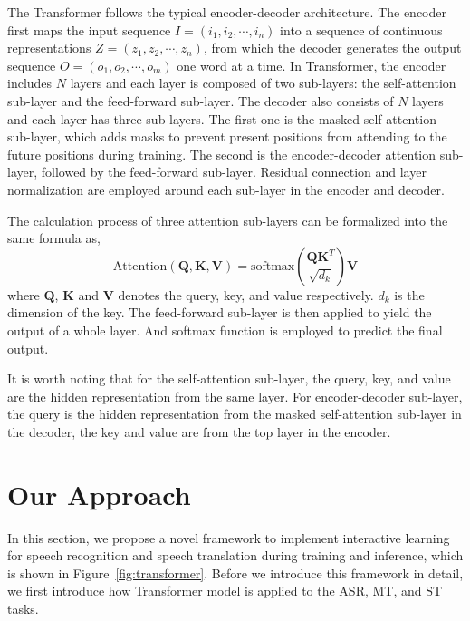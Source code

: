\documentclass[letterpaper]{article} %
\begin{document}
The Transformer follows the typical encoder-decoder architecture. The encoder first maps the input sequence $\mathbf{\mathit{I}}=(i_1,i_2,\cdots,i_n)$ into a sequence of continuous representations $\mathbf{\mathit{Z}}=(z_1,z_2,\cdots,z_n)$, from which  the decoder generates the output sequence $\mathbf{\mathit{O}}=(o_1,o_2,\cdots,o_m)$ one word at a time. In Transformer, the encoder includes $N$ layers and each layer is composed of two sub-layers: the self-attention sub-layer and the feed-forward sub-layer.
The decoder also consists of $N$ layers and each layer has three sub-layers. The first one is the masked self-attention sub-layer, which adds masks to prevent present positions from attending to the future positions during training. The second is the encoder-decoder attention sub-layer, followed by the feed-forward sub-layer. Residual connection and layer normalization are employed around each sub-layer in the encoder and decoder.

The calculation process of three attention sub-layers can be formalized into the same formula as,
\begin{equation}
\mathrm{Attention(\mathbf{Q},\mathbf{K},\mathbf{V})}=\mathrm{softmax}(\frac{\mathbf{Q}\mathbf{K}^T}{\sqrt{d_k}})\mathbf{V}
\label{equ:Attention}
\end{equation}
where $\mathbf{Q}$, $\mathbf{K}$ and $\mathbf{V}$ denotes the query, key, and value respectively. $d_k$ is the dimension of the key.
The feed-forward sub-layer is then applied to yield the output of a whole layer. And softmax function is employed to predict the final output.

It is worth noting that for the self-attention sub-layer, the query, key, and value are the hidden representation from the same layer. For encoder-decoder sub-layer, the query is the hidden representation from the masked self-attention sub-layer in the decoder, the key and value are from the top layer in the encoder.

\section{Our Approach}
In this section, we propose a novel framework to implement interactive learning for speech recognition and speech translation during training and inference, which is shown in Figure~\ref{fig:transformer}. Before we introduce this framework in detail, we first introduce how Transformer model is applied to the ASR, MT, and ST tasks.
\end{document}
